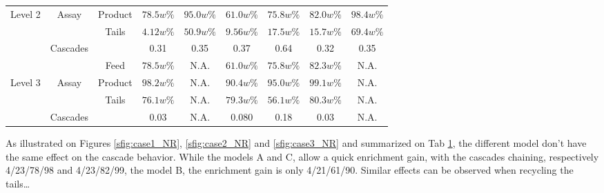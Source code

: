 \begin{table}[h!]
\begin{tabular}{ccccccccc}
Level 2 & Assay      & Product   & $78.5w\%$ & $95.0w\%$ & $61.0w\%$ & $75.8w\%$ & $82.0w\%$ & $98.4w\%$ \\
        &            & Tails      & $4.12w\%$ & $50.9w\%$ & $9.56w\%$ & $17.5w\%$ & $15.7w\%$ & $69.4w\%$ \\
        & Cascades   &           & 0.31      & 0.35      & 0.37      & 0.64      & 0.32      & 0.35      \\
\midrule                                                                                                 
        &            & Feed      & $78.5w\%$ & N.A.      & $61.0w\%$ & $75.8w\%$ & $82.3w\%$ & N.A.      \\
Level 3 & Assay      & Product   & $98.2w\%$ & N.A.      & $90.4w\%$ & $95.0w\%$ & $99.1w\%$ & N.A.      \\
        &            & Tails      & $76.1w\%$ & N.A.      & $79.3w\%$ & $56.1w\%$ & $80.3w\%$ & N.A.      \\
        & Cascades   &           & 0.03      & N.A.      & 0.080     & 0.18      & 0.03      & N.A.      \\
\bottomrule
\end{tabular}
  \label{tab:level}
\end{table}

As illustrated on Figures \ref{sfig:case1_NR}, \ref{sfig:case2_NR} and
\ref{sfig:case3_NR} and summarized on Tab \ref{tab:level}, the different model
don't have the same effect on the cascade behavior. While the models A and C,
allow a quick enrichment gain, with the cascades chaining, respectively
4/23/78/98 and 4/23/82/99, the model B, the enrichment gain is only
4/21/61/90.  Similar effects can be observed when recycling the tails\ldots


